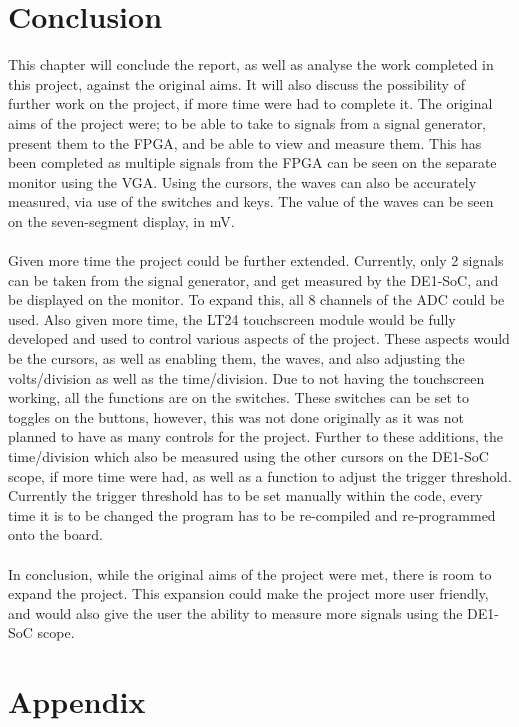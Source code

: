 \documentclass[a4paper,12pt]{article}
\begin{document}
\section{Conclusion}
\begin{flushleft}
This chapter will conclude the report, as well as analyse the work completed in this project, against the original aims. It will also discuss the possibility of further work on the project, if more time were had to complete it. 
The original aims of the project were; to be able to take to signals from a signal generator, present them to the FPGA, and be able to view and measure them. This has been completed as multiple signals from the FPGA can be seen on the separate monitor using the VGA. Using the cursors, the waves can also be accurately measured, via use of the switches and keys.  The value of the waves can be seen on the seven-segment display, in mV. \\ \- \\
Given more time the project could be further extended. Currently, only 2 signals can be taken from the signal generator, and get measured by the DE1-SoC, and be displayed on the monitor. To expand this, all 8 channels of the ADC could be used. Also given more time, the LT24 touchscreen module would be fully developed and used to control various aspects of the project. These aspects would be the cursors, as well as enabling them, the waves, and also adjusting the volts/division as well as the time/division. Due to not having the touchscreen working, all the functions are on the switches. These switches can be set to toggles on the buttons, however, this was not done originally as it was not planned to have as many controls for the project. Further to these additions, the time/division which also be measured using the other cursors on the DE1-SoC scope, if more time were had, as well as a function to adjust the trigger threshold. Currently the trigger threshold has to be set manually within the code, every time it is to be changed the program has to be re-compiled and re-programmed onto the board. \\ \- \\
In conclusion, while the original aims of the project were met, there is room to expand the project. This expansion could make the project more user friendly, and would also give the user the ability to measure more signals using the DE1-SoC scope. 
\end{flushleft}
\newpage
\section{Appendix}
\end{document}
